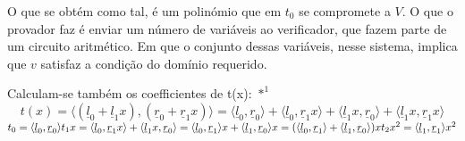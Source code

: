 O que se obtém como tal, é um polinómio que em $t_0$ se compromete a $V$. O que o provador faz é enviar um número de variáveis ao verificador, que fazem parte de um circuito aritmético. Em que o conjunto dessas variáveis, nesse sistema, implica que $v$ satisfaz a condição do domínio requerido.\newline

Calculam-se também os coefficientes de t(x): $*^1$
\[t(x) = \langle (\underline{l}_0 + \underline{l}_1 x), (\underline{r}_0 + \underline{r}_1 x) \rangle = \langle \underline{l}_0, \underline{r}_0 \rangle + \langle \underline{l}_0, \underline{r}_1 x \rangle + \langle \underline{l}_1 x, \underline{r}_0 \rangle + \langle \underline{l}_1 x, \underline{r}_1 x \rangle\]
\newline
$t_0 = \langle \underline{l}_0, \underline{r}_0 \rangle\\
t_1 x = \langle \underline{l}_0, \underline{r}_1 x \rangle + \langle \underline{l}_1 x, \underline{r}_0 \rangle = \langle \underline{l}_0, \underline{r}_1 \rangle x + \langle \underline{l}_1, \underline{r}_0 \rangle x = (\langle \underline{l}_0, \underline{r}_1 \rangle + \langle \underline{l}_1, \underline{r}_0 \rangle ) x\\
t_2 x^2 = \langle \underline{l}_1, \underline{r}_1 \rangle x^2$

